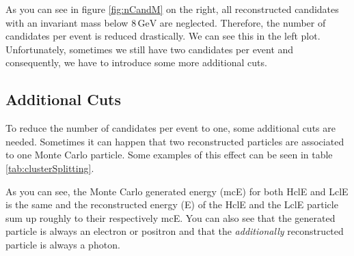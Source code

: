 \documentclass[a4paper,11pt,twosided,final,german,openbib,pdftex,listof=totoc,bibliography=totoc]{scrbook}
\begin{document}
As you can see in figure \ref{fig:nCandM} on the right, all reconstructed candidates with an invariant mass below $8\,\textrm{GeV}$ are neglected. Therefore, the number of candidates per event is reduced drastically. We can see this in the left plot. Unfortunately, sometimes we still have two candidates per event and consequently, we have to introduce some more additional cuts.



\subsection{Additional Cuts}

To reduce the number of candidates per event to one, some additional cuts are needed. Sometimes it can happen that two reconstructed particles are associated to one Monte Carlo particle. Some examples of this effect can be seen in table \ref{tab:clusterSplitting}. 


\begin{table}[h!]
	\centering
	\caption[Cluster Splitting Examples]{Some examples for events with cluster splitting. mcE is the same for LclE and HclE. The energies are in GeV. }
	\label{tab:clusterSplitting}
\end{table}

As you can see, the Monte Carlo generated energy (mcE) for both HclE and LclE is the same and the reconstructed energy (E) of the HclE and the LclE particle sum up roughly to their respectively mcE. You can also see that the generated particle is always an electron or positron and that the \textit{additionally} reconstructed particle is always a photon.
\end{document}
